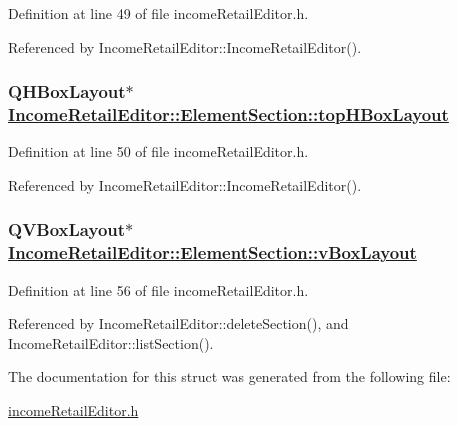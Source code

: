 Definition at line 49 of file income\-Retail\-Editor.h.

Referenced by Income\-Retail\-Editor::Income\-Retail\-Editor().\hypertarget{structIncomeRetailEditor_1_1ElementSection_o1}{
\subsubsection[topHBoxLayout]{\setlength{\rightskip}{0pt plus 5cm}QHBox\-Layout$\ast$ \hyperlink{structIncomeRetailEditor_1_1ElementSection_o1}{Income\-Retail\-Editor::Element\-Section::top\-HBox\-Layout}}}
\label{structIncomeRetailEditor_1_1ElementSection_o1}


Definition at line 50 of file income\-Retail\-Editor.h.

Referenced by Income\-Retail\-Editor::Income\-Retail\-Editor().\hypertarget{structIncomeRetailEditor_1_1ElementSection_o7}{
\subsubsection[vBoxLayout]{\setlength{\rightskip}{0pt plus 5cm}QVBox\-Layout$\ast$ \hyperlink{structIncomeRetailEditor_1_1ElementSection_o7}{Income\-Retail\-Editor::Element\-Section::v\-Box\-Layout}}}
\label{structIncomeRetailEditor_1_1ElementSection_o7}


Definition at line 56 of file income\-Retail\-Editor.h.

Referenced by Income\-Retail\-Editor::delete\-Section(), and Income\-Retail\-Editor::list\-Section().

The documentation for this struct was generated from the following file:\begin{CompactItemize}
\item 
\hyperlink{incomeRetailEditor_8h}{income\-Retail\-Editor.h}\end{CompactItemize}

